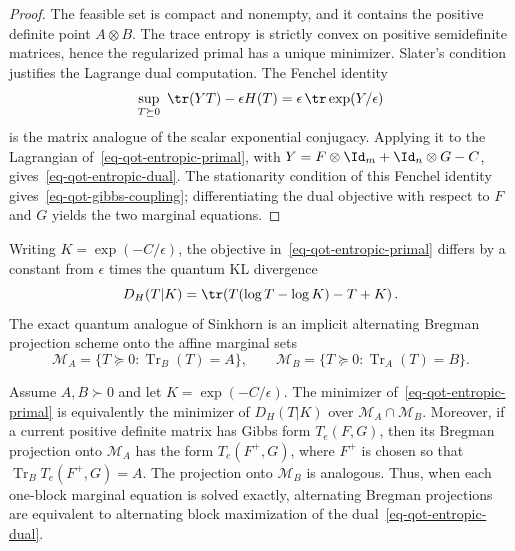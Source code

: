 \begin{proof}
	The feasible set is compact and nonempty, and it contains the positive definite point $A\otimes B$. The trace entropy is strictly convex on positive semidefinite matrices, hence the regularized primal has a unique minimizer. Slater's condition justifies the Lagrange dual computation. The Fenchel identity
	\[
		\sup_{T\succeq0}\ \tr(YT)-\epsilon H(T)
		=
		\epsilon\,\tr\exp(Y/\epsilon)
	\]
	is the matrix analogue of the scalar exponential conjugacy. Applying it to the Lagrangian of~\eqref{eq-qot-entropic-primal}, with
	$Y=F\otimes\Id_m+\Id_n\otimes G-C$, gives~\eqref{eq-qot-entropic-dual}. The stationarity condition of this Fenchel identity gives~\eqref{eq-qot-gibbs-coupling}; differentiating the dual objective with respect to $F$ and $G$ yields the two marginal equations.
\end{proof}

Writing $K=\exp(-C/\epsilon)$, the objective in~\eqref{eq-qot-entropic-primal} differs by a constant from $\epsilon$ times the quantum KL divergence
\[
	D_H(T|K)
	=
	\tr\!\left(T(\log T-\log K)-T+K\right).
\]
The exact quantum analogue of Sinkhorn is an implicit alternating Bregman projection scheme onto the affine marginal sets
\[
	\mathcal M_A=\{T\succeq0:\operatorname{Tr}_B(T)=A\},
	\qquad
	\mathcal M_B=\{T\succeq0:\operatorname{Tr}_A(T)=B\}.
\]

\begin{prop}\label{prop-qot-bregman-projections}
	Assume $A,B\succ0$ and let $K=\exp(-C/\epsilon)$. The minimizer of~\eqref{eq-qot-entropic-primal} is equivalently the minimizer of $D_H(T|K)$ over $\mathcal M_A\cap\mathcal M_B$. Moreover, if a current positive definite matrix has Gibbs form $T_e(F,G)$, then its Bregman projection onto $\mathcal M_A$ has the form $T_e(F^+,G)$, where $F^+$ is chosen so that $\operatorname{Tr}_B T_e(F^+,G)=A$. The projection onto $\mathcal M_B$ is analogous. Thus, when each one-block marginal equation is solved exactly, alternating Bregman projections are equivalent to alternating block maximization of the dual~\eqref{eq-qot-entropic-dual}.
\end{prop}


